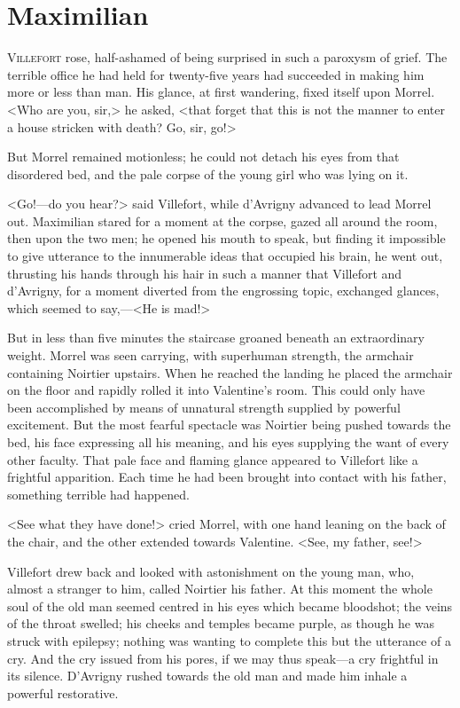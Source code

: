 \chapter{Maximilian} 

 \lettrine{V}{illefort} rose, half-ashamed of being surprised in such a paroxysm of grief. The terrible office he had held for twenty-five years had succeeded in making him more or less than man. His glance, at first wandering, fixed itself upon Morrel. <Who are you, sir,> he asked, <that forget that this is not the manner to enter a house stricken with death? Go, sir, go!> 

 But Morrel remained motionless; he could not detach his eyes from that disordered bed, and the pale corpse of the young girl who was lying on it. 

 <Go!—do you hear?> said Villefort, while d'Avrigny advanced to lead Morrel out. Maximilian stared for a moment at the corpse, gazed all around the room, then upon the two men; he opened his mouth to speak, but finding it impossible to give utterance to the innumerable ideas that occupied his brain, he went out, thrusting his hands through his hair in such a manner that Villefort and d'Avrigny, for a moment diverted from the engrossing topic, exchanged glances, which seemed to say,—<He is mad!> 

 But in less than five minutes the staircase groaned beneath an extraordinary weight. Morrel was seen carrying, with superhuman strength, the armchair containing Noirtier upstairs. When he reached the landing he placed the armchair on the floor and rapidly rolled it into Valentine's room. This could only have been accomplished by means of unnatural strength supplied by powerful excitement. But the most fearful spectacle was Noirtier being pushed towards the bed, his face expressing all his meaning, and his eyes supplying the want of every other faculty. That pale face and flaming glance appeared to Villefort like a frightful apparition. Each time he had been brought into contact with his father, something terrible had happened. 

 <See what they have done!> cried Morrel, with one hand leaning on the back of the chair, and the other extended towards Valentine. <See, my father, see!> 

 Villefort drew back and looked with astonishment on the young man, who, almost a stranger to him, called Noirtier his father. At this moment the whole soul of the old man seemed centred in his eyes which became bloodshot; the veins of the throat swelled; his cheeks and temples became purple, as though he was struck with epilepsy; nothing was wanting to complete this but the utterance of a cry. And the cry issued from his pores, if we may thus speak—a cry frightful in its silence. D'Avrigny rushed towards the old man and made him inhale a powerful restorative. 

